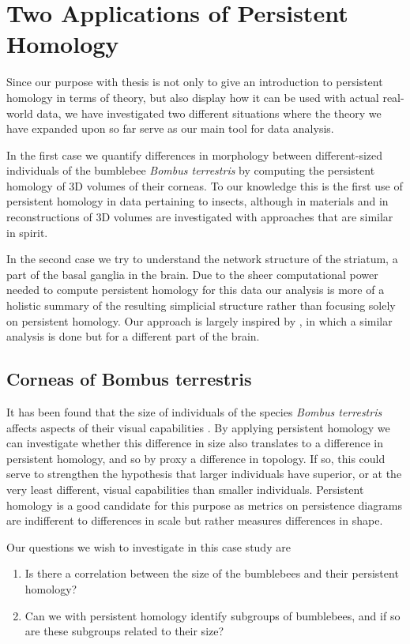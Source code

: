 \chapter{Two Applications of Persistent Homology}
Since our purpose with thesis is not only to give an introduction to persistent homology in terms of theory, but also display how it can be used with actual real-world data, we have investigated two different situations where the theory we have expanded upon so far serve as our main tool for data analysis.

In the first case we quantify differences in morphology between different-sized individuals of the bumblebee \textit{Bombus terrestris} by computing the persistent homology of 3D volumes of their corneas. To our knowledge this is the first use of persistent homology in data pertaining to insects, although in \cite{moon2019, delgadofriedrichs2014} materials and in \cite{gutierrez2012, gutierrez2014} reconstructions of 3D volumes are investigated with approaches that are similar in spirit.

In the second case we try to understand the network structure of the striatum, a part of the basal ganglia in the brain. Due to the sheer computational power needed to compute persistent homology for this data our analysis is more of a holistic summary of the resulting simplicial structure rather than focusing solely on persistent homology. Our approach is largely inspired by \cite{reimann}, in which a similar analysis is done but for a different part of the brain.

\section{Corneas of Bombus terrestris}
It has been found that the size of individuals of the species \textit{Bombus terrestris} affects aspects of their visual capabilities \cite{emily}. By applying persistent homology we can investigate whether this difference in size also translates to a difference in persistent homology, and so by proxy a difference in topology. If so, this could serve to strengthen the hypothesis that larger individuals have superior, or at the very least different, visual capabilities than smaller individuals. Persistent homology is a good candidate for this purpose as metrics on persistence diagrams are indifferent to differences in scale but rather measures differences in shape.

Our questions we wish to investigate in this case study are
\begin{enumerate}
  \item Is there a correlation between the size of the bumblebees and their persistent homology?
  \item Can we with persistent homology identify subgroups of bumblebees, and if so are these subgroups related to their size?

\end{enumerate}

